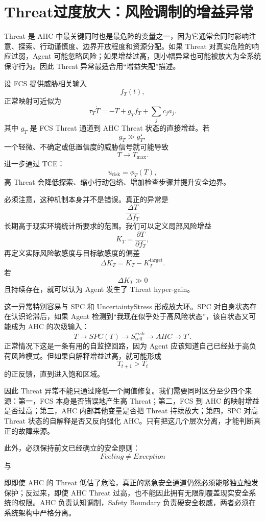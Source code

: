 \section{Threat过度放大：风险调制的增益异常}
\label{sec:ahc_threat_amplification}

Threat 是 AHC 中最关键同时也是最危险的变量之一，因为它通常会同时影响注意、探索、行动谨慎度、边界开放程度和资源分配。如果 Threat 对真实危险的响应过弱，Agent 可能忽略风险；如果增益过高，则小幅异常也可能被放大为全系统保守行为。因此 Threat 异常最适合用“增益失配”描述。

设 FCS 提供威胁相关输入
\[
f_T(t),
\]
正常映射可近似为
\[
\tau_T\dot T
=
-T
+
g_Tf_T
+
\sum_j c_j a_j.
\]
其中 $g_T$ 是 FCS Threat 通道到 AHC Threat 状态的直接增益。若
\[
g_T\gg g_T^\star,
\]
一个轻微、不确定或低置信度的威胁信号就可能导致
\[
T\rightarrow T_{\max}.
\]
进一步通过 TCE：
\[
u_{\mathrm{risk}}
=
\phi_T(T),
\]
高 Threat 会降低探索、缩小行动包络、增加检查步骤并提升安全边界。

必须注意，这种机制本身并不是错误。真正的异常是
\[
\frac{\Delta T}{\Delta f_T}
\]
长期高于现实环境统计所要求的范围。我们可以定义局部风险增益
\[
K_T
=
\frac{\partial T}{\partial f_T},
\]
再定义实际风险敏感度与目标敏感度的偏差
\[
\Delta K_T
=
K_T-K_T^{\mathrm{target}}.
\]
若
\[
\Delta K_T\gg0
\]
且持续存在，就可以认为 Agent 发生了 Threat hyper-gain。

这一异常特别容易与 SPC 和 UncertaintyStress 形成放大环。SPC 对自身状态存在认识论滞后，如果 Agent 检测到“我现在似乎处于高风险状态”，该自状态又可能成为 AHC 的次级输入：
\[
T
\rightarrow
SPC(T)
\rightarrow
S_{\mathrm{self}}^{risk}
\rightarrow
AHC
\rightarrow
T'.
\]
正常情况下这是一条有用的自监控回路，因为 Agent 应该知道自己已经处于高负荷风险模式。但如果自解释增益过高，就可能形成
\[
T_{t+1}>T_t
\]
的正反馈，直到进入饱和区域。

因此 Threat 异常不能只通过降低一个阈值修复。我们需要同时区分至少四个来源：第一，FCS 本身是否错误地产生高 Threat；第二，FCS 到 AHC 的映射增益是否过高；第三，AHC 内部其他变量是否把 Threat 持续放大；第四，SPC 对高 Threat 状态的自解释是否又反向强化 AHC。只有把这几个层次分离，才能判断真正的故障来源。

此外，必须保持前文已经确立的安全原则：
\[
\boxed{
Feeling\neq Exception
}
\]
与
\begin{statementbox}
\centering
{}
\end{statementbox}
即即使 AHC 的 Threat 低估了危险，真正的紧急安全通道仍然必须能够独立触发保护；反过来，即使 AHC Threat 过高，也不能因此拥有无限制覆盖现实安全系统的权限。AHC 负责认知调制，Safety Boundary 负责硬安全权威，两者必须在系统架构中严格分离。

